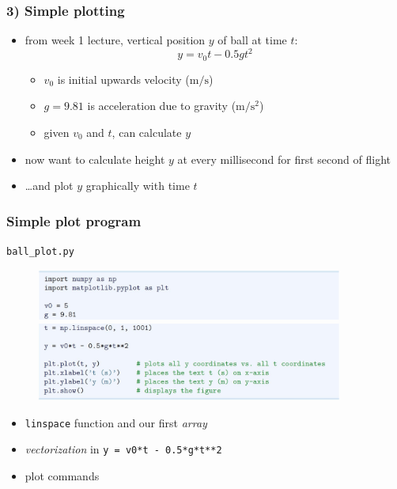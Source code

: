 \documentclass[14pt]{beamer}
\newcommand\red[1]{{\color{red} #1}}
\begin{document}
\begin{frame}[fragile]

\frametitle{3) Simple plotting}

\begin{itemize}
	\item from week 1 lecture, vertical position $y$ of ball at time $t$:
	\[
		y = v_0 t - 0.5gt^2
	\]
	\begin{itemize}
		\item $v_0$ is initial upwards velocity ($\mathrm{m/s}$)
		\item $g = 9.81$ is acceleration due to gravity ($\mathrm{m/s^2}$)
		\item given $v_0$ and $t$, can calculate $y$
	\end{itemize}
	
	\item now want to calculate height $y$ at every millisecond for first second of flight
	\item \ldots and plot $y$ graphically with time $t$
\end{itemize}


\end{frame}


\begin{frame}[fragile]

\frametitle{Simple plot program}

\vspace*{-6mm}
\begin{center}
{\small
\texttt{ball\_plot.py}
}
\end{center}
\vspace*{-8mm}
\begin{figure}[ht]
	\centering
	\includegraphics[width=0.9\textwidth]{figures/LLp19}
	\includegraphics[width=0.9\textwidth]{figures/LLp20a}
\end{figure}
\vspace*{-8mm}
\begin{itemize}
	\item \texttt{linspace} function and our first \red{\emph{array}}
	\item \red{\emph{vectorization}} in \texttt{y = v0*t - 0.5*g*t**2}
	\item plot commands
\end{itemize}

\end{frame}
\end{document}
